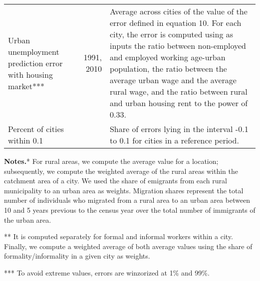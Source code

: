 \begin{sidewaystable}[htbp]
\begin{tabular}{p{14.445em}rp{37.89em}}
    Urban unemployment prediction error with housing market*** & \multicolumn{1}{p{7.055em}}{1991, 2010} &   Average across cities of the value of the error defined in equation 10. For each city, the error is computed using as inputs the ratio between non-employed and employed working age-urban population, the ratio between the average urban wage and the average rural wage, and the ratio between rural and urban housing rent to the power of 0.33.    \\
    Percent of cities within 0.1 &       & Share of errors lying in the interval -0.1  to  0.1  for cities in a reference period. \\


    \bottomrule

    \end{tabular}%
  \label{tab:addlabel}%
 \begin{tablenotes}
			\footnotesize \textbf{Notes.}*  For rural areas, we compute the average value for a location; subsequently, we compute the weighted average of the rural areas within the catchment area of a city.  We used the share of emigrants from each rural municipality to an urban area as weights.  Migration shares represent the total number of individuals who migrated from a rural area to an urban area between 10 and 5 years previous to the census year over the total number of immigrants of the urban area.

 ** It is computed separately for formal and informal workers within a city. Finally, we compute a weighted average of both average values using the share of formality/informality in a given city as weights.

  *** To avoid extreme values, errors are winzorized at 1\% and 99\%.


			\end{tablenotes}

\end{sidewaystable}%

